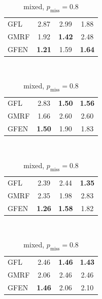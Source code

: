 \documentclass[a4paper, 11pt]{article}
\begin{document}
\begin{table}[tb]
\begin{subtable}[b]{.4\linewidth}
\begin{tabular}{l|c|c|c}
         GFL & 2.87 & 2.99 & 1.88 \\ 
         GMRF & 1.92 & \textbf{1.42} &  2.48 \\ 
         GFEN & \textbf{1.21} & 1.59 & \textbf{1.64} \\ 
      \end{tabular}
     \caption{smooth, $p_\text{miss} = 0.8$}
    \end{subtable}\vspace{10px}\\
    \begin{subtable}[b]{.4\linewidth}
      \centering
      \begin{tabular}{l|c|c|c}
         GFL & 2.83 & \textbf{1.50} & \textbf{1.56} \\ 
         GMRF & 1.66 & 2.60 & 2.60 \\ 
         GFEN & \textbf{1.50} & 1.90 & 1.83 \\ 
      \end{tabular}
     \caption{mixed, $p_\text{miss} = 0.1$}
    \end{subtable}%
    ~
    \begin{subtable}[b]{.4\linewidth}
      \centering
      \begin{tabular}{l|c|c|c}
         GFL & 2.39 & 2.44 & \textbf{1.35} \\ 
         GMRF &  2.35  & 1.98  & 2.83 \\ 
         GFEN & \textbf{1.26} & \textbf{1.58} & 1.82 \\ 
      \end{tabular}
     \caption{mixed, $p_\text{miss} = 0.8$}
    \end{subtable}\vspace{10px}\\
    \begin{subtable}[b]{.4\linewidth}
      \centering
      \begin{tabular}{l|c|c|c}
         GFL & 2.46 & \textbf{1.46} & \textbf{1.43} \\ 
         GMRF & 2.06 & 2.46 & 2.46 \\ 
         GFEN & \textbf{1.46} & 2.06 & 2.10 \\ 
      \end{tabular}

\end{subtable}
\end{table}
\end{document}

